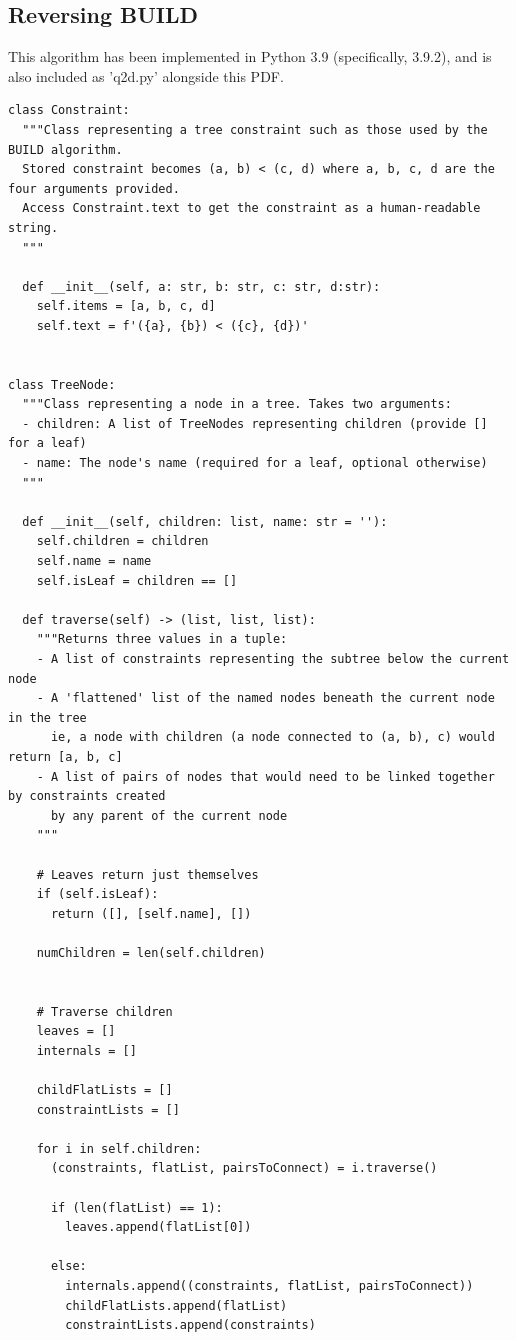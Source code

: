 \documentclass[11pt]{article} %
\begin{document}
\begin{landscape}
\subsection{Reversing BUILD}
This algorithm has been implemented in Python 3.9 (specifically, 3.9.2), and is also included as 'q2d.py' alongside this PDF.
\begin{lstlisting}
class Constraint:
  """Class representing a tree constraint such as those used by the BUILD algorithm.
  Stored constraint becomes (a, b) < (c, d) where a, b, c, d are the four arguments provided.
  Access Constraint.text to get the constraint as a human-readable string.
  """

  def __init__(self, a: str, b: str, c: str, d:str):
    self.items = [a, b, c, d]
    self.text = f'({a}, {b}) < ({c}, {d})'


class TreeNode:
  """Class representing a node in a tree. Takes two arguments:
  - children: A list of TreeNodes representing children (provide [] for a leaf)
  - name: The node's name (required for a leaf, optional otherwise)
  """

  def __init__(self, children: list, name: str = ''):
    self.children = children
    self.name = name
    self.isLeaf = children == []
  
  def traverse(self) -> (list, list, list):
    """Returns three values in a tuple:
    - A list of constraints representing the subtree below the current node
    - A 'flattened' list of the named nodes beneath the current node in the tree
      ie, a node with children (a node connected to (a, b), c) would return [a, b, c]
    - A list of pairs of nodes that would need to be linked together by constraints created
      by any parent of the current node
    """

    # Leaves return just themselves
    if (self.isLeaf):
      return ([], [self.name], [])
    
    numChildren = len(self.children)


    # Traverse children
    leaves = []
    internals = []

    childFlatLists = []
    constraintLists = []

    for i in self.children:
      (constraints, flatList, pairsToConnect) = i.traverse()

      if (len(flatList) == 1):
        leaves.append(flatList[0])
      
      else:
        internals.append((constraints, flatList, pairsToConnect))
        childFlatLists.append(flatList)
        constraintLists.append(constraints)


\end{lstlisting}
\end{landscape}
\end{document}
